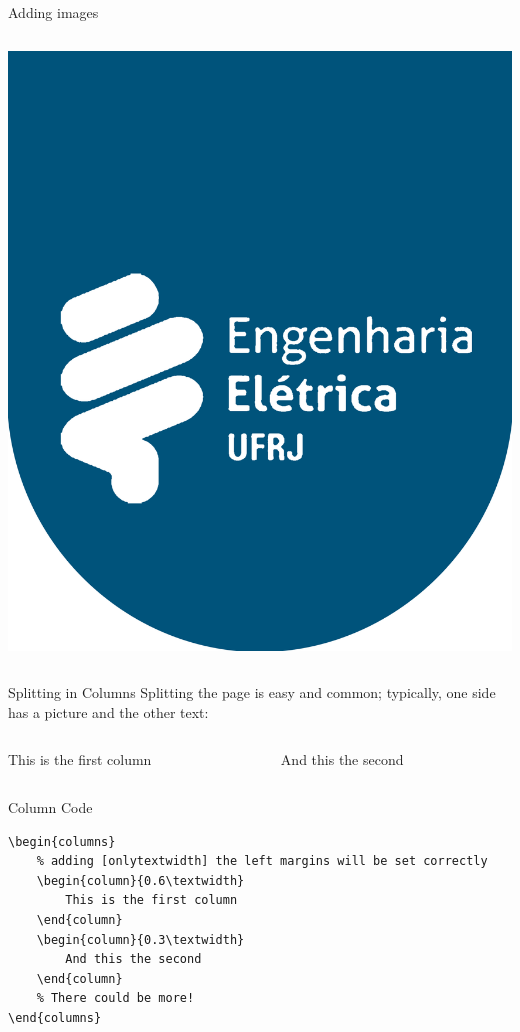 \begin{frame}[fragile]{Adding images}
\begin{columns}
\begin{column}{0.3\textwidth}
\includegraphics[width=\textwidth]
{assets/logo_RGB}
\end{column}
\end{columns}
\end{frame}


\begin{frame}[fragile]{Splitting in Columns}
Splitting the page is easy and common; typically, one side has a picture and the other text:
\begin{columns}  %
\begin{column}{0.6\textwidth}
This is the first column
\end{column}
\begin{column}{0.3\textwidth}
And this the second
\end{column}
\end{columns}
\begin{block}{Column Code}
\begin{verbatim}
\begin{columns} 
    % adding [onlytextwidth] the left margins will be set correctly
    \begin{column}{0.6\textwidth}
        This is the first column
    \end{column}
    \begin{column}{0.3\textwidth}
        And this the second
    \end{column}
    % There could be more!
\end{columns}
\end{verbatim}
\end{block}

\end{frame}
